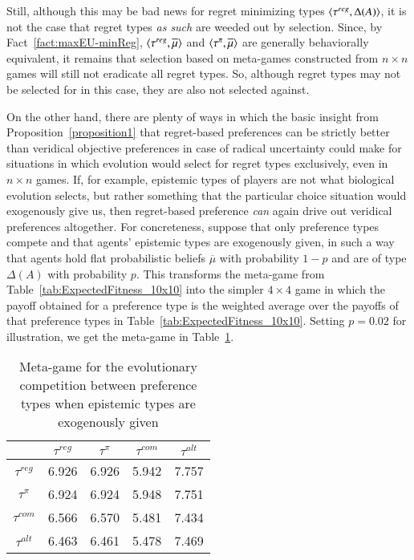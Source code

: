 \documentclass[fleqn,reqno,11pt]{article}
\begin{document}
Still, although this may be bad news for regret minimizing types
$\left \langle \tau^{reg}, \Delta(A)\right\rangle$, it is not the case that regret types \emph{as such} are weeded
out by selection. Since, by Fact~\ref{fact:maxEU-minReg}, $\left \langle \tau^{reg}, \overline{\mu}\right\rangle$ and
$\left \langle \tau^{\pi}, \overline{\mu}\right\rangle$ are generally behaviorally equivalent, it remains that
selection based on meta-games constructed from $n \times n$ games will still not eradicate all
regret types. So, although regret types may not be selected for in this case, they are also not
selected against.

On the other hand, there are plenty of ways in which the basic insight from
Proposition~\ref{proposition1} that regret-based preferences can be strictly better than
veridical objective preferences in case of radical uncertainty could make for situations in
which evolution would select for regret types exclusively, even in $n \times n$ games. If, for
example, epistemic types of players are not what biological evolution selects, but rather
something that the particular choice situation would exogenously give us, then regret-based
preference \emph{can} again drive out veridical preferences altogether. For concreteness,
suppose that only preference types compete and that agents' epistemic types are exogenously
given, in such a way that agents hold flat probabilistic beliefs $\overline{\mu}$ with probability
$1-p$ and are of type $\Delta(A)$ with probability $p$. This transforms the meta-game from
Table~\ref{tab:ExpectedFitness_10x10} into the simpler $4 \times 4$ game in which the payoff
obtained for a preference type is the weighted average over the payoffs of that preference
types in Table~\ref{tab:ExpectedFitness_10x10}. Setting $p = 0.02$ for illustration, we get the
meta-game in Table~\ref{tab:ExogeneousEpistemics}. 

\begin{table}[]
\centering
\begin{tabular}{ccccc}
  \toprule
  & $\tau^{reg}$ 
  & $\tau^{\pi}$ 
  & $\tau^{com}$
  & $\tau^{alt}$ \\ 
  \midrule
  $\tau^{reg} $ & 6.926 & 6.926 & 5.942 & 7.757 \\ 
  $\tau^{\pi} $ & 6.924 & 6.924 & 5.948 & 7.751 \\ 
  $\tau^{com }$ & 6.566 & 6.570 & 5.481 & 7.434 \\ 
  $\tau^{alt} $ & 6.463 & 6.461 & 5.478 & 7.469 \\ 
   \bottomrule
\end{tabular}
\caption{Meta-game for the evolutionary competition between preference types when epistemic types are exogenously
  given}
\label{tab:ExogeneousEpistemics}
\end{table}
\end{document}
